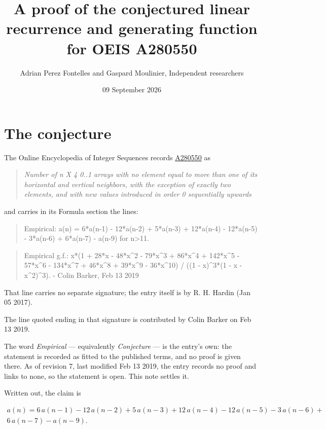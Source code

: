 \documentclass[11pt]{article}
\title{A proof of the conjectured linear recurrence and generating function for OEIS A280550}
\author{Adrian Perez Fontelles and Gaspard Moulinier, Independent researchers}
\date{09 September 2026}
\theoremstyle{definition}
\begin{document}
\maketitle
\section{The conjecture}

The Online Encyclopedia of Integer Sequences records \href{https://oeis.org/A280550}{A280550} as

\begin{quote}\itshape Number of n X 4 0..1 arrays with no element equal to more than one of its horizontal and vertical neighbors, with the exception of exactly two elements, and with new values introduced in order 0 sequentially upwards\end{quote}

and carries in its Formula section the lines:

\begin{quote}\ttfamily Empirical: a(n) = 6*a(n-1) - 12*a(n-2) + 5*a(n-3) + 12*a(n-4) - 12*a(n-5) - 3*a(n-6) + 6*a(n-7) - a(n-9) for n>11.\end{quote}

\begin{quote}\ttfamily Empirical g.f.: x*(1 + 28*x - 48*x\textasciicircum{}2 - 79*x\textasciicircum{}3 + 86*x\textasciicircum{}4 + 142*x\textasciicircum{}5 - 57*x\textasciicircum{}6 - 134*x\textasciicircum{}7 + 46*x\textasciicircum{}8 + 39*x\textasciicircum{}9 - 36*x\textasciicircum{}10) / ((1 - x)\textasciicircum{}3*(1 - x - x\textasciicircum{}2)\textasciicircum{}3). - Colin Barker, Feb 13 2019\end{quote}

That line carries no separate signature; the entry itself is by R. H. Hardin (Jan 05 2017).

The line quoted ending in that signature is contributed by Colin Barker on Feb 13 2019.

The word {\itshape Empirical} --- equivalently {\itshape Conjecture} --- is the entry's own: the statement is recorded as fitted to the published terms, and no proof is given there. As of revision 7, last modified Feb 13 2019, the entry records no proof and links to none, so the statement is open. This note settles it.

Written out, the claim is

\begin{multline*} a(n) = 6\,a(n-1) - 12\,a(n-2) + 5\,a(n-3) + 12\,a(n-4) - 12\,a(n-5) - 3\,a(n-6) + \\ 6\,a(n-7) - a(n-9). \end{multline*}
\end{document}
